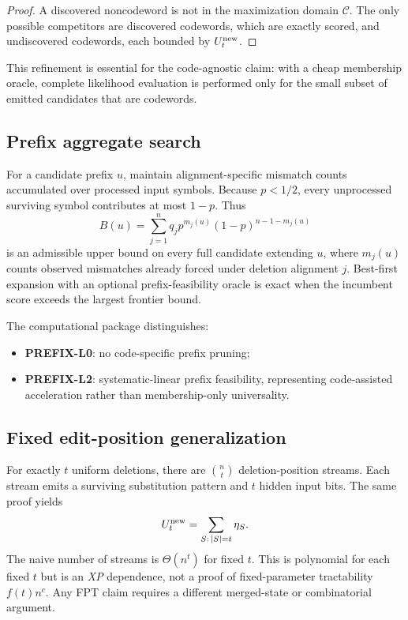 \documentclass[11pt]{article}
\newcommand{\cC}{\mathcal C}
\begin{document}
\begin{proof}
A discovered noncodeword is not in the maximization domain $\cC$. The only possible competitors are discovered codewords, which are exactly scored, and undiscovered codewords, each bounded by $U_t^{\rm new}$.
\end{proof}

This refinement is essential for the code-agnostic claim: with a cheap membership oracle, complete likelihood evaluation is performed only for the small subset of emitted candidates that are codewords.

\subsection{Prefix aggregate search}
For a candidate prefix $u$, maintain alignment-specific mismatch counts accumulated over processed input symbols. Because $p<1/2$, every unprocessed surviving symbol contributes at most $1-p$. Thus
\begin{equation}
B(u)=\sum_{j=1}^{n}q_jp^{m_j(u)}(1-p)^{n-1-m_j(u)}
\end{equation}
is an admissible upper bound on every full candidate extending $u$, where $m_j(u)$ counts observed mismatches already forced under deletion alignment $j$. Best-first expansion with an optional prefix-feasibility oracle is exact when the incumbent score exceeds the largest frontier bound.

The computational package distinguishes:
\begin{itemize}
\item \textbf{PREFIX-L0}: no code-specific prefix pruning;
\item \textbf{PREFIX-L2}: systematic-linear prefix feasibility, representing code-assisted acceleration rather than membership-only universality.
\end{itemize}

\subsection{Fixed edit-position generalization}
For exactly $t$ uniform deletions, there are $\binom nt$ deletion-position streams. Each stream emits a surviving substitution pattern and $t$ hidden input bits. The same proof yields
\begin{equation}
U_t^{\rm new}=\sum_{S:\,|S|=t}\eta_S.
\end{equation}
The naive number of streams is $\Theta(n^t)$ for fixed $t$. This is polynomial for each fixed $t$ but is an \emph{XP} dependence, not a proof of fixed-parameter tractability $f(t)n^c$. Any FPT claim requires a different merged-state or combinatorial argument.
\end{document}

